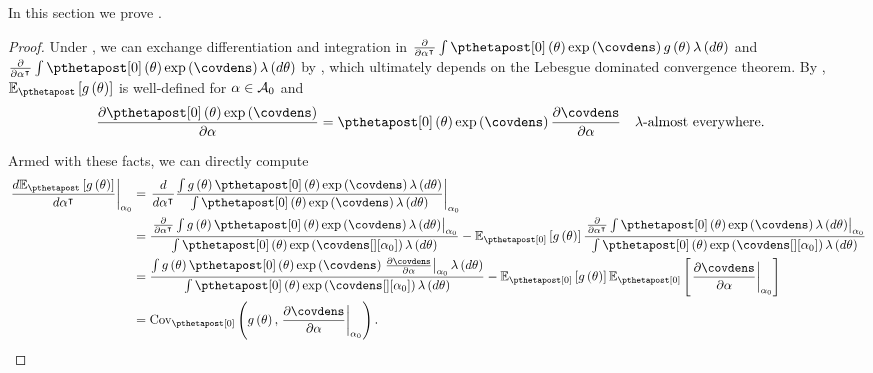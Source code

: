 \documentclass{article}\usepackage[]{graphicx}\usepackage[]{color}
\theoremstyle{definition}
\theoremstyle{plain}
\theoremstyle{plain}
\theoremstyle{plain}
\theoremstyle{definition}
\theoremstyle{plain}
\theoremstyle{plain}
\begin{document}
In this section we prove .
\begin{proof}
Under , we can exchange differentiation
and integration in
$\frac{\partial}{\partial \alpha^{\trans}} \int \pzeropost\left(\theta\right)\exp\left(\covdens\right)
g\left(\theta\right)\lambda\left(d\theta\right)$
and $\frac{\partial}{\partial \alpha^{\trans}} \int \pzeropost\left(\theta\right)\exp\left(\covdens\right)\lambda\left(d\theta\right)$
by \citet[Chapter 5-11, Theorem 18]{fleming:1965:functions}, which
ultimately depends on the Lebesgue dominated convergence theorem.
By ,
$\mbe_{\pthetapost}\left[g\left(\theta\right)\right]$
is well-defined for $\alpha\in\mathcal{A}_{0}$ and
\begin{align*}
\frac{\partial \pzeropost\left(\theta\right)\exp\left(\covdens\right)}{\partial\alpha} &
    =\pzeropost\left(\theta\right)\exp\left(\covdens\right)
    \frac{\partial\covdens}{\partial\alpha}\quad\lambda\textrm{-almost everywhere}.
\end{align*}

Armed with these facts, we can directly compute
\begin{align*}
\left.\frac{d\mbe_{\pthetapost}\left[g\left(\theta\right)\right]}
    {d\alpha^{\trans}}\right|_{\alpha_{0}} &
    =\left.\frac{d}{d\alpha^{\trans}}
    \frac{\int g\left(\theta\right)
          \pzeropost\left(\theta\right)\exp\left(\covdens\right)
    \lambda\left(d\theta\right)}
    {\int \pzeropost\left(\theta\right)\exp\left(\covdens\right)
    \lambda\left(d\theta\right)}\right|_{\alpha_{0}}\\
 & =\frac{\left.\frac{\partial}{\partial\alpha^{\trans}}
    \int g\left(\theta\right)
    \pzeropost\left(\theta\right)\exp\left(\covdens\right)
    \lambda\left(d\theta\right)\right|_{\alpha_{0}}}
    {\int \pzeropost\left(\theta\right)
    \exp\left(\covdens[][\alpha_{0}]\right)\lambda\left(d\theta\right)}-
        \mbe_{\pzeropost}\left[g\left(\theta\right)\right]
        \frac{\left.\frac{\partial}{\partial\alpha^{\trans}}
        \int \pzeropost\left(\theta\right)\exp\left(\covdens\right)
        \lambda\left(d\theta\right)\right|_{\alpha_{0}}}
        {\int \pzeropost\left(\theta\right)\exp\left(\covdens[][\alpha_{0}]\right)
        \lambda\left(d\theta\right)}\\
 & =\frac{\int g\left(\theta\right)\pzeropost\left(\theta\right)
    \exp\left(\covdens\right)\left.\frac{\partial\covdens}{\partial\alpha}
    \right|_{\alpha_{0}}\lambda\left(d\theta\right)}
    {\int \pzeropost\left(\theta\right)\exp\left(\covdens[][\alpha_{0}]\right)
    \lambda\left(d\theta\right)}-\mbe_{\pzeropost}
    \left[g\left(\theta\right)\right]\mbe_{\pzeropost}
    \left[\left.\frac{\partial\covdens}{\partial\alpha}\right|_{\alpha_{0}}\right]\\
 & =\cov_{\pzeropost}\left(g\left(\theta\right),\left.
    \frac{\partial\covdens}{\partial\alpha}\right|_{\alpha_{0}}\right).
\end{align*}
\end{proof}
\end{document}
